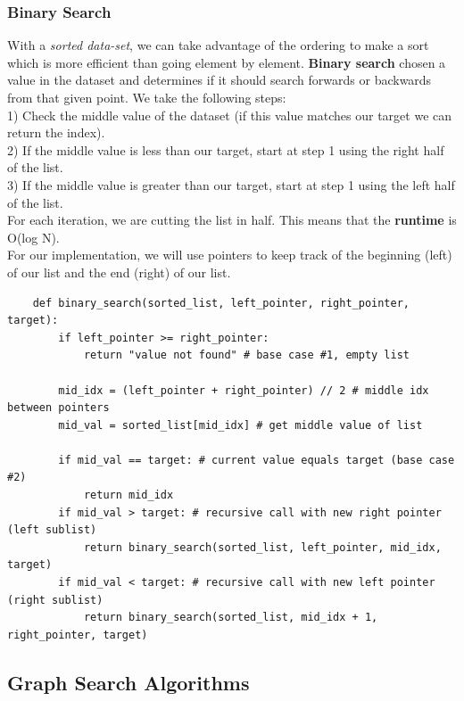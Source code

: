\documentclass[11pt, a4paper]{article}
\begin{document}
\begin{spacing}{1.1}
	\subsubsection{Binary Search}
	With a \textit{sorted data-set}, we can take advantage of the ordering to make a sort which is more efficient than going element by element. \textbf{Binary search} chosen a value in the dataset and determines if it should search forwards or backwards from that given point. We take the following steps: \\
	\hspace*{3mm} 1) Check the middle value of the dataset (if this value matches our target we can return the index). \\
	\hspace*{3mm} 2) If the middle value is less than our target, start at step 1 using the right half of the list.  \\
	\hspace*{3mm} 3) If the middle value is greater than our target, start at step 1 using the left half of the list.  \vspace*{2mm} \\
	For each iteration, we are cutting the list in half. This means that the \textbf{runtime} is O(log N). \vspace*{2mm} \\
	For our implementation, we will use pointers to keep track of the beginning (left) of our list and the end (right) of our list. 
	\begin{lstlisting}
	def binary_search(sorted_list, left_pointer, right_pointer, target):
		if left_pointer >= right_pointer:
			return "value not found" # base case #1, empty list
		
		mid_idx = (left_pointer + right_pointer) // 2 # middle idx between pointers
		mid_val = sorted_list[mid_idx] # get middle value of list
		
		if mid_val == target: # current value equals target (base case #2)
			return mid_idx
		if mid_val > target: # recursive call with new right pointer (left sublist)
			return binary_search(sorted_list, left_pointer, mid_idx, target)
		if mid_val < target: # recursive call with new left pointer (right sublist)
			return binary_search(sorted_list, mid_idx + 1, right_pointer, target) \end{lstlisting} \newpage

	\subsection{Graph Search Algorithms}

\end{spacing}
\end{document}
